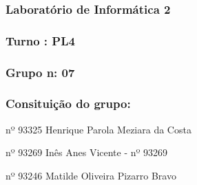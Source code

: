 \subsubsection*{Laboratório de Informática 2}

\subsubsection*{Turno \+: P\+L4}

\subsubsection*{Grupo n\+: 07}

\subsubsection*{Consituição do grupo\+:}


\begin{DoxyItemize}
\item nº 93325 Henrique Parola Meziara da Costa
\item nº 93269 Inês Anes Vicente -\/ nº 93269
\item nº 93246 Matilde Oliveira Pizarro Bravo 
\end{DoxyItemize}